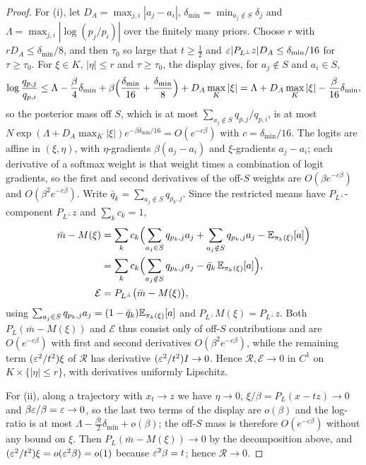 \documentclass{article} %
\newcommand{\iclrbr}{\\&}\newcommand{\iclrbrq}{\\&\qquad}\newcommand{\iclrqbr}{\\&}
\newcommand{\iclrbr}{}\newcommand{\iclrbrq}{}\newcommand{\iclrqbr}{\qquad}
\theoremstyle{plain}
\theoremstyle{definition}
\theoremstyle{remark}
\begin{document}
\begin{proof}
For (i), let $D_A=\max_{j,i}|a_j-a_i|$, $\delta_{\min}=\min_{a_j\notin S}\delta_j$ and
$\Lambda=\max_{j,i}|\log(p_j/p_i)|$ over the finitely many priors. Choose $r$ with
$r D_A\le\delta_{\min}/8$, and then $\tau_0$ so large that $t\ge\tfrac12$ and
$\varepsilon|P_{L^\perp}z|D_A\le\delta_{\min}/16$ for $\tau\ge\tau_0$. For $\xi\in K$, $|\eta|\le r$ and
$\tau\ge\tau_0$, the display gives, for $a_j\notin S$ and $a_i\in S$,
\[
\log\frac{q_{p,j}}{q_{p,i}}
\le\Lambda-\frac{\beta}{4}\delta_{\min}+\beta\Bigl(\frac{\delta_{\min}}{16}+\frac{\delta_{\min}}{8}\Bigr)
+D_A\max_K|\xi|
=\Lambda+D_A\max_K|\xi|-\frac{\beta}{16}\delta_{\min},
\]
so the posterior mass off $S$, which is at most $\sum_{a_j\notin S}q_{p,j}/q_{p,i}$, is at most
$N\exp(\Lambda+D_A\max_K|\xi|)e^{-\beta\delta_{\min}/16}=O(e^{-c\beta})$ with $c=\delta_{\min}/16$. The logits are affine in $(\xi,\eta)$, with
$\eta$-gradients $\beta(a_j-a_i)$ and $\xi$-gradients $a_j-a_i$; each derivative of a softmax weight
is that weight times a combination of logit gradients, so the first and second derivatives of the
off-$S$ weights are $O(\beta e^{-c\beta})$ and $O(\beta^2e^{-c\beta})$. Write
$\bar q_k=\sum_{a_j\notin S}q_{p_k,j}$. Since the restricted means have $P_{L^\perp}$-component
$P_{L^\perp}z$ and $\sum_kc_k=1$,
\begin{align*}
\bar m-M(\xi)
&=\sum_kc_k\Bigl(\sum_{a_j\in S}q_{p_k,j}a_j+\sum_{a_j\notin S}q_{p_k,j}a_j
-\E_{\pi_k(\xi)}[a]\Bigr)
\iclrbr=\sum_kc_k\Bigl(\sum_{a_j\notin S}q_{p_k,j}a_j-\bar q_k\,\E_{\pi_k(\xi)}[a]\Bigr),\\
\mathcal E&=P_{L^\perp}\bigl(\bar m-M(\xi)\bigr),
\end{align*}
using $\sum_{a_j\in S}q_{p_k,j}a_j=(1-\bar q_k)\mathbb{E}_{\pi_k(\xi)}[a]$ and $P_{L^\perp}M(\xi)=P_{L^\perp}z$.
Both $P_L(\bar m-M(\xi))$ and $\mathcal E$ thus consist only of off-$S$ contributions and are
$O(e^{-c\beta})$ with first and second derivatives $O(\beta^2e^{-c\beta})$, while the remaining term
$(\varepsilon^2/t^2)\xi$ of $\mathcal R$ has derivative $(\varepsilon^2/t^2)I\to0$. Hence $\mathcal R,\mathcal E\to0$
in $C^1$ on $K\times\{|\eta|\le r\}$, with derivatives uniformly Lipschitz.

For (ii), along a trajectory with $x_t\to z$ we have $\eta\to0$, $\xi/\beta=P_L(x-tz)\to0$ and
$\beta\varepsilon/\beta=\varepsilon\to0$, so the last two terms of the display are $o(\beta)$ and the log-ratio is
at most $\Lambda-\frac{\beta t}{2}\delta_{\min}+o(\beta)$; the off-$S$ mass is therefore
$O(e^{-c\beta})$ without any bound on $\xi$. Then $P_L(\bar m-M(\xi))\to0$ by the decomposition
above, and $(\varepsilon^2/t^2)\xi=o(\varepsilon^2\beta)=o(1)$ because $\varepsilon^2\beta=t$; hence $\mathcal R\to0$.
\end{proof}
\end{document}
